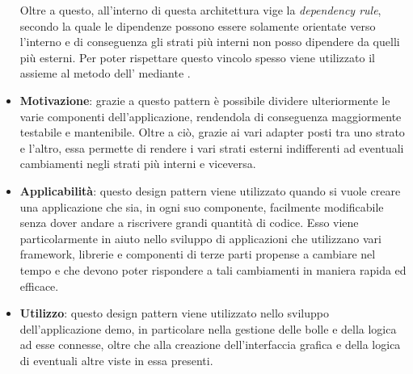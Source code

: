 \begin{itemize}
	Oltre a questo, all'interno di questa architettura vige la \textit{dependency rule}, secondo la quale le dipendenze possono essere solamente orientate verso l'interno e di conseguenza gli strati più interni non posso dipendere da quelli più esterni. Per poter rispettare questo vincolo spesso viene utilizzato il  assieme al metodo dell' mediante .
	\item \textbf{Motivazione}: grazie a questo pattern è possibile dividere ulteriormente le varie componenti dell'applicazione, rendendola di conseguenza maggiormente testabile e mantenibile. Oltre a ciò, grazie ai vari adapter posti tra uno strato e l'altro, essa permette di rendere i vari strati esterni indifferenti ad eventuali cambiamenti negli strati più interni e viceversa.
	\item \textbf{Applicabilità}: questo design pattern viene utilizzato quando si vuole creare una applicazione che sia, in ogni suo componente, facilmente modificabile senza dover andare a riscrivere grandi quantità di codice. Esso viene particolarmente in aiuto nello sviluppo di applicazioni che utilizzano vari framework, librerie e componenti di terze parti propense a cambiare nel tempo e che devono poter rispondere a tali cambiamenti in maniera rapida ed efficace.
	\item \textbf{Utilizzo}: questo design pattern viene utilizzato nello sviluppo dell'applicazione demo, in particolare nella gestione delle bolle e della logica ad esse connesse, oltre che alla creazione dell'interfaccia grafica e della logica di eventuali altre viste in essa presenti.
\end{itemize}
 